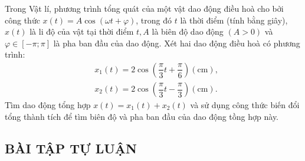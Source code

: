 \begin{vd}
	Trong Vật lí, phương trình tổng quát của một vật dao động điều hoà cho bởi công thức $x(t)=A \cos (\omega t+\varphi)$, trong đó $t$ là thời điểm (tính bằng giây), $x(t)$ là li độ của vật tại thời điểm $t, A$ là biên độ dao động $(A>0)$ và $\varphi \in[-\pi ; \pi]$ là pha ban đầu của dao động. Xét hai dao động điều hoà có phương trình:
	$$
		\begin{aligned}
			 & x_1(t)=2 \cos \left(\dfrac{\pi}{3} t+\dfrac{\pi}{6}\right)(\mathrm{cm}),  \\
			 & x_2(t)=2 \cos \left(\dfrac{\pi}{3} t-\dfrac{\pi}{3}\right)(\mathrm{cm}) .
		\end{aligned}
	$$
	Tìm dao động tổng hợp $x(t)=x_1(t)+x_2(t)$ và sử dụng công thức biến đổi tổng thành tích để tìm biên độ và pha ban đầu của dao động tồng hợp này.
\end{vd} 

\subsection{BÀI TẬP TỰ LUẬN}

